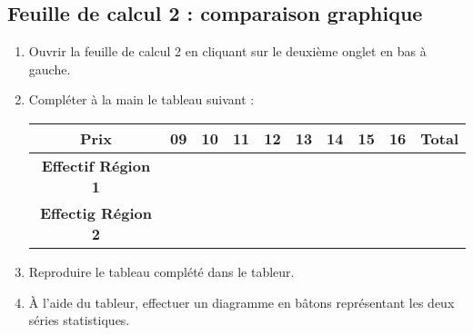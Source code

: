 \documentclass[10pt,french]{article}
\begin{document}
\subsection*{Feuille de calcul 2 : comparaison graphique}
\begin{enumerate}
    \item Ouvrir la feuille de calcul 2 en cliquant sur le deuxième onglet en bas à gauche.
    \item Compléter à la main le tableau suivant :
    \begin{center}
        \begin{tabular}{*{10}{|c}|}
        \hline
            \textbf{Prix} & 09 & 10 & 11 & 12 & 13 & 14 & 15 & 16 & Total \\
        \hline
            \textbf{Effectif Région 1} & &&&&&&&& \\
        \hline
            \textbf{Effectig Région 2} & &&&&&&&& \\
        \hline
        \end{tabular}
    \end{center}
    \item Reproduire le tableau complété dans le tableur.
    \item À l'aide du tableur, effectuer un diagramme en bâtons représentant les deux séries statistiques.
\end{enumerate}
\end{document}

